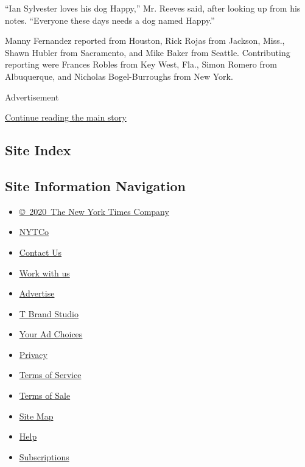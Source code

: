 ``Ian Sylvester loves his dog Happy,'' Mr. Reeves said, after looking up
from his notes. ``Everyone these days needs a dog named Happy.''

Manny Fernandez reported from Houston, Rick Rojas from Jackson, Miss.,
Shawn Hubler from Sacramento, and Mike Baker from Seattle. Contributing
reporting were Frances Robles from Key West, Fla., Simon Romero from
Albuquerque, and Nicholas Bogel-Burroughs from New York.

Advertisement

\protect\hyperlink{after-bottom}{Continue reading the main story}

\hypertarget{site-index}{%
\subsection{Site Index}\label{site-index}}

\hypertarget{site-information-navigation}{%
\subsection{Site Information
Navigation}\label{site-information-navigation}}

\begin{itemize}
\tightlist
\item
  \href{https://help.nytimes.com/hc/en-us/articles/115014792127-Copyright-notice}{©~2020~The
  New York Times Company}
\end{itemize}

\begin{itemize}
\tightlist
\item
  \href{https://www.nytco.com/}{NYTCo}
\item
  \href{https://help.nytimes.com/hc/en-us/articles/115015385887-Contact-Us}{Contact
  Us}
\item
  \href{https://www.nytco.com/careers/}{Work with us}
\item
  \href{https://nytmediakit.com/}{Advertise}
\item
  \href{http://www.tbrandstudio.com/}{T Brand Studio}
\item
  \href{https://www.nytimes.com/privacy/cookie-policy\#how-do-i-manage-trackers}{Your
  Ad Choices}
\item
  \href{https://www.nytimes.com/privacy}{Privacy}
\item
  \href{https://help.nytimes.com/hc/en-us/articles/115014893428-Terms-of-service}{Terms
  of Service}
\item
  \href{https://help.nytimes.com/hc/en-us/articles/115014893968-Terms-of-sale}{Terms
  of Sale}
\item
  \href{https://spiderbites.nytimes.com}{Site Map}
\item
  \href{https://help.nytimes.com/hc/en-us}{Help}
\item
  \href{https://www.nytimes.com/subscription?campaignId=37WXW}{Subscriptions}
\end{itemize}
